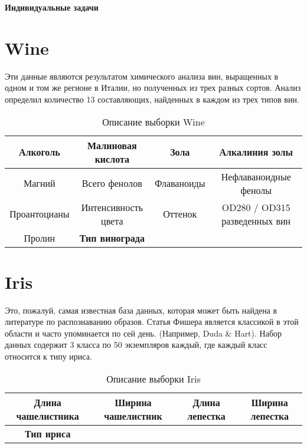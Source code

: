 \documentclass[12pt, twoside]{article}
\begin{document}
 

\begin{center}
{\LARGE\bf
Индивидуальные задачи
}
\end{center}

\section{Wine\cite{Wine}}
Эти данные являются результатом химического анализа вин, выращенных в одном и том же регионе в Италии, но полученных из трех разных сортов. Анализ определил количество 13 составляющих, найденных в каждом из трех типов вин.

\begin{table}[h]
\begin{center}
\caption{Описание выборки Wine}
\begin{tabular}{|c|c|c|c|}
\hline
Алкоголь&Малиновая кислота&Зола&Алкалиния золы\\
\hline
Магний&Всего фенолов&Флаваноиды&Нефлаваноидные фенолы\\
\hline
Проантоцианы&Интенсивность цвета&Оттенок&OD280 / OD315 разведенных вин\\
\hline
Пролин&\bf Тип винограда&&\\
\hline
\end{tabular}
\end{center}
\end{table}

\section{Iris\cite{Iris}}
Это, пожалуй, самая известная база данных, которая может быть найдена в литературе по распознаванию образов. Статья Фишера является классикой в этой области и часто упоминается по сей день. (Например, Duda \& Hart). Набор данных содержит 3 класса по 50 экземпляров каждый, где каждый класс относится к типу ириса.

\begin{table}[h]
\begin{center}
\caption{Описание выборки Iris}
\begin{tabular}{|c|c|c|c|}
\hline
Длина чашелистника &Ширина чашелистник&Длина лепестка&Ширина лепестка\\
\hline
\bf Тип ириса&&&\\
\hline
\end{tabular}
\end{center}
\end{table}
\end{document}
